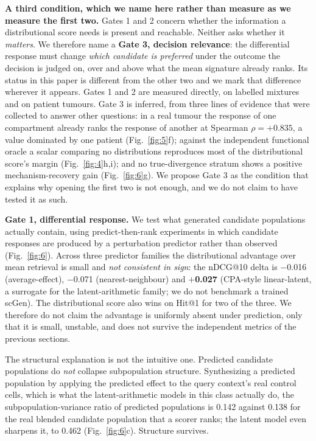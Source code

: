 \documentclass[11pt,letterpaper]{article}
\newcommand{\PREMISEDISJOINT}{+0.835}
\begin{document}
\textbf{A third condition, which we name here rather than measure as we measure the first two.}
Gates 1 and 2 concern whether the information a distributional score needs is present and
reachable. Neither asks whether it \emph{matters}. We therefore name a \textbf{Gate 3, decision
relevance}: the differential response must change \emph{which candidate is preferred} under the
outcome the decision is judged on, over and above what the mean signature already ranks. Its
status in this paper is different from the other two and we mark that difference wherever it
appears. Gates 1 and 2 are measured directly, on labelled mixtures and on patient tumours. Gate 3
is inferred, from three lines of evidence that were collected to answer other questions: in a real
tumour the response of one compartment already ranks the response of another at Spearman
$\rho = \PREMISEDISJOINT$, a value dominated by one patient (Fig.~\ref{fig:5}f); against the
independent functional oracle a scalar comparing no distributions reproduces most of the
distributional score's margin (Fig.~\ref{fig:4}h,i); and no true-divergence stratum shows a
positive mechanism-recovery gain (Fig.~\ref{fig:6}g). We propose Gate 3 as the condition that
explains why opening the first two is not enough, and we do not claim to have tested it as such.

\textbf{Gate 1, differential response.} We test what generated candidate populations actually
contain, using predict-then-rank experiments in which candidate responses are produced by a
perturbation predictor rather than observed (Fig.~\ref{fig:6}). Across three predictor families
the distributional advantage over mean retrieval is small and \emph{not consistent in sign}: the
nDCG@10 delta is $-$0.016 (average-effect), $-$0.071 (nearest-neighbour) and \textbf{$+$0.027}
(CPA-style linear-latent, a surrogate for the latent-arithmetic family; we do not benchmark a
trained scGen). The distributional score also wins on Hit@1 for two of the three. We therefore do not claim the
advantage is uniformly absent under prediction, only that it is small, unstable, and does not
survive the independent metrics of the previous sections.

The structural explanation is not the intuitive one. Predicted candidate populations do
\emph{not} collapse subpopulation structure. Synthesizing a predicted population by
applying the predicted effect to the query context's real control cells, which is what the
latent-arithmetic models in this class actually do, the subpopulation-variance ratio of
predicted populations is 0.142 against 0.138 for the real blended
candidate population that a scorer ranks; the latent model even sharpens it, to 0.462
(Fig.~\ref{fig:6}c). Structure survives.
\end{document}
